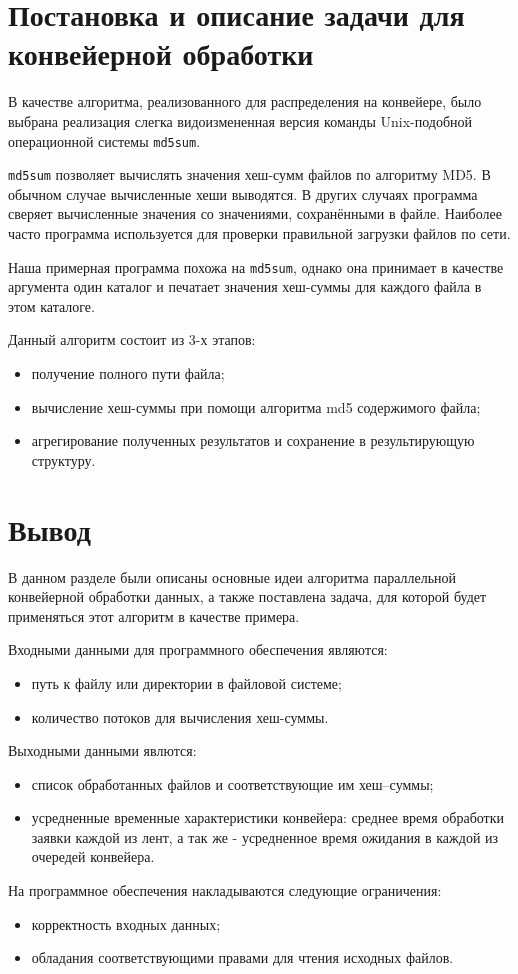 \section{Постановка и описание задачи для конвейерной об­работки}

В качестве алгоритма, реализованного для распределения на конвейере, было выбрана
реализация слегка видоизмененная версия команды Unix-подобной операционной системы \texttt{md5sum}. 

\texttt{md5sum} позволяет вычислять значения хеш-сумм файлов по алгоритму MD5. В
обычном случае вычисленные хеши выводятся. В других случаях программа сверяет 
вычисленные значения со значениями, сохранёнными в файле. Наиболее часто программа 
используется для проверки правильной загрузки файлов по сети. 

Наша примерная программа похожа на \texttt{md5sum}, однако она принимает в качестве 
аргумента один каталог и печатает значения хеш-суммы для каждого файла в этом каталоге.

Данный алгоритм состоит из 3-х этапов:

\begin{itemize}
	\item получение полного пути файла;
	\item вычисление хеш-суммы при помощи алгоритма md5\cite{md5} содержимого файла;
	\item агрегирование полученных результатов и сохранение в результирующую структуру.
\end{itemize}


\section{Вывод}

В данном разделе были описаны основные идеи алгоритма парал­лельной 
конвейерной обработки данных, а также поставлена задача, для которой 
будет применяться этот алгоритм в качестве примера.

Входными данными для программного обеспечения являются:
\begin{itemize}
	\item путь к файлу или директории в файловой системе;
	\item количество потоков для вычисления хеш-суммы.
\end{itemize}

Выходными данными явлются:
\begin{itemize}
	\item список обработанных файлов и соответствующие им хеш–суммы;
	\item усредненные временные характеристики конвейера: среднее время обработки заявки 
	каждой из лент, а так же - усредненное время ожидания в каждой из очередей конвейера.
\end{itemize}

На программное обеспечения накладываются следующие ограничения:
\begin{itemize}
	\item корректность входных данных;
	\item обладания соответствующими правами для чтения исходных файлов.
\end{itemize}